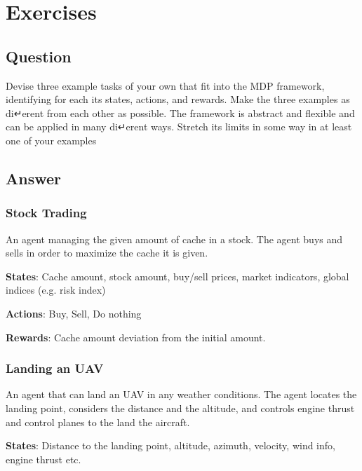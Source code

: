 \documentclass[11pt]{article}
\begin{document}
    \maketitle
    \setcounter{section}{2}


    \section{Exercises}

    \subsection{Question}
    Devise three example tasks of your own that fit into the MDP framework,
    identifying for each its states, actions, and rewards. Make the three examples as di↵erent
    from each other as possible. The framework is abstract and flexible and can be applied in
    many di↵erent ways. Stretch its limits in some way in at least one of your examples

    \subsection*{Answer}

    \subsubsection*{Stock Trading}

    An agent managing the given amount of cache in a stock.
    The agent buys and sells in order to maximize the cache it is given.

    \textbf{States}: Cache amount, stock amount, buy/sell prices, market indicators, global indices (e.g. risk index)

    \textbf{Actions}: Buy, Sell, Do nothing

    \textbf{Rewards}: Cache amount deviation from the initial amount.

    \subsubsection*{Landing an UAV}

    An agent that can land an UAV in any weather conditions.
    The agent locates the landing point, considers the distance and the altitude, and controls engine thrust and control planes to the land the aircraft.

    \textbf{States}: Distance to the landing point, altitude, azimuth, velocity, wind info, engine thrust etc.
\end{document}
